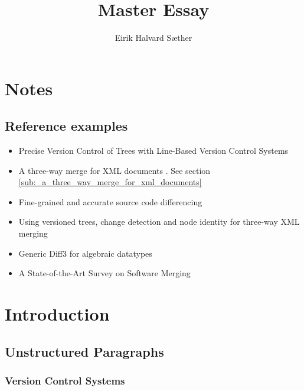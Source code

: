 \documentclass[a4paper,english]{ifimaster}
\title{Master Essay}
\author{Eirik Halvard Sæther}
\begin{document}
\maketitle
\newpage

\frontmatter{}

\tableofcontents

\mainmatter{}

\chapter{Notes}

\section{Reference examples}%
\label{sec:reference_examples}

\begin{itemize}
	\item Precise Version Control of Trees with Line-Based Version Control Systems \parencite{cite:precise_version_control_of_trees}
	\item A three-way merge for {XML} documents \parencite{cite:lindholm_xml_merge}. See section \ref{sub:_a_three_way_merge_for_xml_documents}
	\item Fine-grained and accurate source code differencing \parencite{cite:fine_grained_source_code_diff}
	\item Using versioned trees, change detection and node identity for three-way {XML} merging \parencite{cite:cheng_ethan_xml_merge}
	\item Generic Diff3 for algebraic datatypes \parencite{cite:generic_diff_for_adt}
	\item A State-of-the-Art Survey on Software Merging \parencite{cite:tom_mens_software_merging_survey}


\end{itemize}

\chapter{Introduction}
\label{cha:introduction}

\section{Unstructured Paragraphs}%
\label{sec:unstructured_paragraphs}

\subsection{Version Control Systems}%
\label{sub:version_control_systems}
\end{document}
